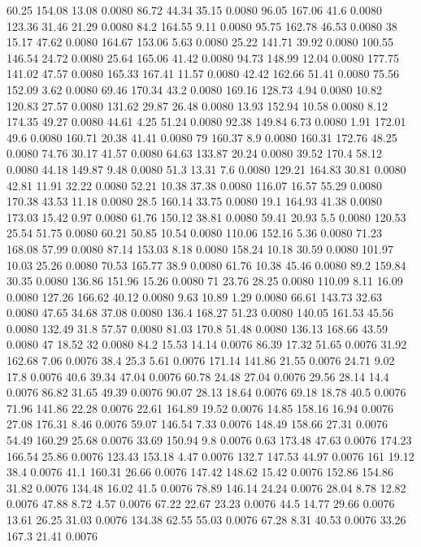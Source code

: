 60.25	154.08	13.08	0.0080
86.72	44.34	35.15	0.0080
96.05	167.06	41.6	0.0080
123.36	31.46	21.29	0.0080
84.2	164.55	9.11	0.0080
95.75	162.78	46.53	0.0080
38	15.17	47.62	0.0080
164.67	153.06	5.63	0.0080
25.22	141.71	39.92	0.0080
100.55	146.54	24.72	0.0080
25.64	165.06	41.42	0.0080
94.73	148.99	12.04	0.0080
177.75	141.02	47.57	0.0080
165.33	167.41	11.57	0.0080
42.42	162.66	51.41	0.0080
75.56	152.09	3.62	0.0080
69.46	170.34	43.2	0.0080
169.16	128.73	4.94	0.0080
10.82	120.83	27.57	0.0080
131.62	29.87	26.48	0.0080
13.93	152.94	10.58	0.0080
8.12	174.35	49.27	0.0080
44.61	4.25	51.24	0.0080
92.38	149.84	6.73	0.0080
1.91	172.01	49.6	0.0080
160.71	20.38	41.41	0.0080
79	160.37	8.9	0.0080
160.31	172.76	48.25	0.0080
74.76	30.17	41.57	0.0080
64.63	133.87	20.24	0.0080
39.52	170.4	58.12	0.0080
44.18	149.87	9.48	0.0080
51.3	13.31	7.6	0.0080
129.21	164.83	30.81	0.0080
42.81	11.91	32.22	0.0080
52.21	10.38	37.38	0.0080
116.07	16.57	55.29	0.0080
170.38	43.53	11.18	0.0080
28.5	160.14	33.75	0.0080
19.1	164.93	41.38	0.0080
173.03	15.42	0.97	0.0080
61.76	150.12	38.81	0.0080
59.41	20.93	5.5	0.0080
120.53	25.54	51.75	0.0080
60.21	50.85	10.54	0.0080
110.06	152.16	5.36	0.0080
71.23	168.08	57.99	0.0080
87.14	153.03	8.18	0.0080
158.24	10.18	30.59	0.0080
101.97	10.03	25.26	0.0080
70.53	165.77	38.9	0.0080
61.76	10.38	45.46	0.0080
89.2	159.84	30.35	0.0080
136.86	151.96	15.26	0.0080
71	23.76	28.25	0.0080
110.09	8.11	16.09	0.0080
127.26	166.62	40.12	0.0080
9.63	10.89	1.29	0.0080
66.61	143.73	32.63	0.0080
47.65	34.68	37.08	0.0080
136.4	168.27	51.23	0.0080
140.05	161.53	45.56	0.0080
132.49	31.8	57.57	0.0080
81.03	170.8	51.48	0.0080
136.13	168.66	43.59	0.0080
47	18.52	32	0.0080
84.2	15.53	14.14	0.0076
86.39	17.32	51.65	0.0076
31.92	162.68	7.06	0.0076
38.4	25.3	5.61	0.0076
171.14	141.86	21.55	0.0076
24.71	9.02	17.8	0.0076
40.6	39.34	47.04	0.0076
60.78	24.48	27.04	0.0076
29.56	28.14	14.4	0.0076
86.82	31.65	49.39	0.0076
90.07	28.13	18.64	0.0076
69.18	18.78	40.5	0.0076
71.96	141.86	22.28	0.0076
22.61	164.89	19.52	0.0076
14.85	158.16	16.94	0.0076
27.08	176.31	8.46	0.0076
59.07	146.54	7.33	0.0076
148.49	158.66	27.31	0.0076
54.49	160.29	25.68	0.0076
33.69	150.94	9.8	0.0076
0.63	173.48	47.63	0.0076
174.23	166.54	25.86	0.0076
123.43	153.18	4.47	0.0076
132.7	147.53	44.97	0.0076
161	19.12	38.4	0.0076
41.1	160.31	26.66	0.0076
147.42	148.62	15.42	0.0076
152.86	154.86	31.82	0.0076
134.48	16.02	41.5	0.0076
78.89	146.14	24.24	0.0076
28.04	8.78	12.82	0.0076
47.88	8.72	4.57	0.0076
67.22	22.67	23.23	0.0076
44.5	14.77	29.66	0.0076
13.61	26.25	31.03	0.0076
134.38	62.55	55.03	0.0076
67.28	8.31	40.53	0.0076
33.26	167.3	21.41	0.0076

